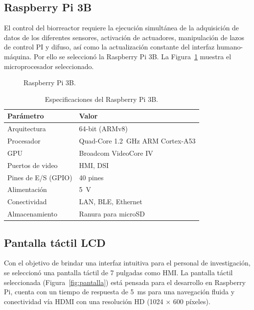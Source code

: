 \documentclass[11pt,tesis,twoside,openright,spanish]{upiiztt}
\begin{document}
\subsection{Raspberry Pi 3B}

El control del biorreactor requiere la ejecución simultánea de la adquisición de datos
de los diferentes sensores, activación de actuadores, manipulación de lazos de
control PI y difuso, así como la actualización constante del interfaz humano-máquina.
Por ello se seleccionó la Raspberry Pi 3B. La Figura~\ref{fig:raspberry} muestra el microprocesador
seleccionado.

\begin{figure}[H]
  \centering
  \caption{Raspberry Pi 3B.}
  \label{fig:raspberry}
\end{figure}

\begin{table}[H]
\centering
\caption{Especificaciones del Raspberry Pi 3B.}
\label{tab:raspberry}
\begin{tabular}{ll}
\toprule
\textbf{Parámetro} & \textbf{Valor} \\
\midrule
Arquitectura       & 64-bit (ARMv8) \\
Procesador         & Quad-Core 1.2~GHz ARM Cortex-A53 \\
GPU                & Broadcom VideoCore IV \\
Puertos de video   & HMI, DSI \\
Pines de E/S (GPIO) & 40 pines \\
Alimentación       & 5~V \\
Conectividad       & LAN, BLE, Ethernet \\
Almacenamiento     & Ranura para microSD \\
\bottomrule
\end{tabular}
\end{table}

\subsection{Pantalla táctil LCD}

Con el objetivo de brindar una interfaz intuitiva para el personal de investigación,
se seleccionó una pantalla táctil de 7 pulgadas como HMI. La pantalla táctil
seleccionada (Figura~\ref{fig:pantalla}) está pensada para el desarrollo en Raspberry Pi, cuenta
con un tiempo de respuesta de 5~ms para una navegación fluida y conectividad vía
HDMI con una resolución HD (1024 $\times$ 600 píxeles).
\end{document}
